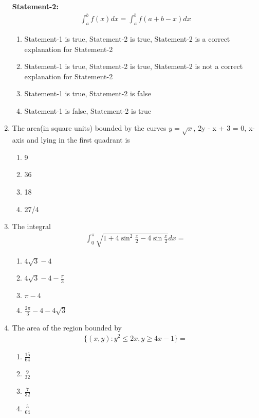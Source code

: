 \begin{enumerate}[label=\arabic*.,ref=\thesubsection.\theenumi]
\textbf{Statement-2:} 
\begin{align*}
\int_{a}^{b}f(x)dx = \int_{a}^{b}f(a + b -x)dx
\end{align*}
\begin{enumerate}
\item Statement-1 is true, Statement-2 is true, Statement-2 is a correct explanation for Statement-2
\item Statement-1 is true, Statement-2 is true, Statement-2 is not a correct explanation for Statement-2
\item Statement-1 is true, Statement-2 is false
\item Statement-1 is false, Statement-2 is true
\end{enumerate}

\item The area(in square units) bounded by the curves $y = \sqrt{x}$, 2y - x + 3 = 0, x-axis and lying in the first quadrant is
\begin{enumerate}
\item 9
\item 36
\item 18
\item 27/4
\end{enumerate}

\item The integral
\begin{align*}
\int_{0}^{\pi}\sqrt{1 + 4\sin^{2}\frac{x}{2} - 4\sin\frac{x}{2}}dx = 
\end{align*}
\begin{enumerate}
\item $4\sqrt{3} - 4$
\item $4\sqrt{3} - 4 - \frac{\pi}{3}$
\item $\pi - 4$
\item $\frac{2\pi}{3} - 4 - 4\sqrt{3}$
\end{enumerate}

\item The area of the region bounded by 
\begin{align*}
\{(x, y): y^2 \leq 2x, y \geq 4x - 1\} = 
\end{align*}
\begin{enumerate}
\item $\frac{15}{64}$
\item $\frac{9}{32}$
\item $\frac{7}{32}$
\item $\frac{5}{64}$
\end{enumerate}


\end{enumerate}
